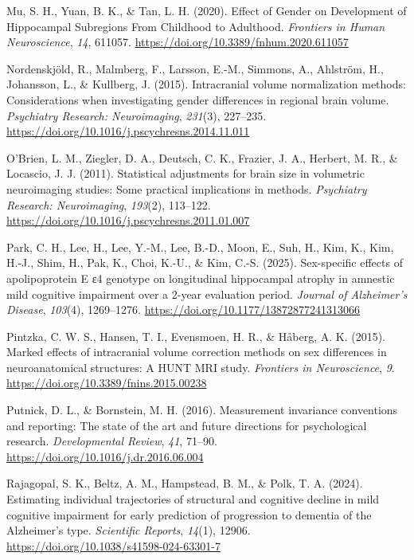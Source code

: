 \documentclass[
]{article}
\newlength{\cslhangindent}
\newenvironment{CSLReferences}[2] %
 {\begin{list}{}{%
  \setlength{\itemindent}{0pt}
  \setlength{\leftmargin}{0pt}
  \setlength{\parsep}{0pt}
  \ifodd #1
   \setlength{\leftmargin}{\cslhangindent}
   \setlength{\itemindent}{-1\cslhangindent}
  \fi
  \setlength{\itemsep}{#2\baselineskip}}}
 {\end{list}}
\begin{document}
\begin{CSLReferences}{1}{0}
Mu, S. H., Yuan, B. K., \& Tan, L. H. (2020). Effect of {Gender} on
{Development} of {Hippocampal} {Subregions} {From} {Childhood} to
{Adulthood}. \emph{Frontiers in Human Neuroscience}, \emph{14}, 611057.
\url{https://doi.org/10.3389/fnhum.2020.611057}

Nordenskjöld, R., Malmberg, F., Larsson, E.-M., Simmons, A., Ahlström,
H., Johansson, L., \& Kullberg, J. (2015). Intracranial volume
normalization methods: {Considerations} when investigating gender
differences in regional brain volume. \emph{Psychiatry Research:
Neuroimaging}, \emph{231}(3), 227--235.
\url{https://doi.org/10.1016/j.pscychresns.2014.11.011}

O'Brien, L. M., Ziegler, D. A., Deutsch, C. K., Frazier, J. A., Herbert,
M. R., \& Locascio, J. J. (2011). Statistical adjustments for brain size
in volumetric neuroimaging studies: {Some} practical implications in
methods. \emph{Psychiatry Research: Neuroimaging}, \emph{193}(2),
113--122. \url{https://doi.org/10.1016/j.pscychresns.2011.01.007}

Park, C. H., Lee, H., Lee, Y.-M., Lee, B.-D., Moon, E., Suh, H., Kim,
K., Kim, H.-J., Shim, H., Pak, K., Choi, K.-U., \& Kim, C.-S. (2025).
Sex-specific effects of apolipoprotein {E} ε4 genotype on longitudinal
hippocampal atrophy in amnestic mild cognitive impairment over a 2-year
evaluation period. \emph{Journal of Alzheimer's Disease}, \emph{103}(4),
1269--1276. \url{https://doi.org/10.1177/13872877241313066}

Pintzka, C. W. S., Hansen, T. I., Evensmoen, H. R., \& Håberg, A. K.
(2015). Marked effects of intracranial volume correction methods on sex
differences in neuroanatomical structures: A {HUNT} {MRI} study.
\emph{Frontiers in Neuroscience}, \emph{9}.
\url{https://doi.org/10.3389/fnins.2015.00238}

Putnick, D. L., \& Bornstein, M. H. (2016). Measurement invariance
conventions and reporting: {The} state of the art and future directions
for psychological research. \emph{Developmental Review}, \emph{41},
71--90. \url{https://doi.org/10.1016/j.dr.2016.06.004}

Rajagopal, S. K., Beltz, A. M., Hampstead, B. M., \& Polk, T. A. (2024).
Estimating individual trajectories of structural and cognitive decline
in mild cognitive impairment for early prediction of progression to
dementia of the {Alzheimer}'s type. \emph{Scientific Reports},
\emph{14}(1), 12906. \url{https://doi.org/10.1038/s41598-024-63301-7}


\end{CSLReferences}
\end{document}
